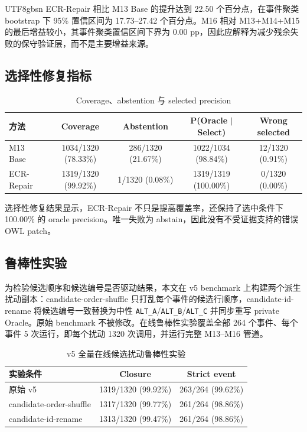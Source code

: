 \documentclass[11pt]{article}
\begin{document}
\begin{CJK*}{UTF8}{gbsn}
ECR-Repair 相比 M13 Base 的提升达到 22.50 个百分点，在事件聚类 bootstrap 下 95\% 置信区间为 17.73--27.42 个百分点。M16 相对 M13+M14+M15 的最后增益较小，其事件聚类置信区间下界为 0.00 pp，因此应解释为减少残余失败的保守验证层，而不是主要增益来源。

\subsection{选择性修复指标}

\begin{table}[t]
\centering
\caption{Coverage、abstention 与 selected precision}
\label{tab:selective}
\begin{tabular}{lcccc}
\toprule
方法 & Coverage & Abstention & P(Oracle $\mid$ Select) & Wrong selected \\
\midrule
M13 Base & 1034/1320 (78.33\%) & 286/1320 (21.67\%) & 1022/1034 (98.84\%) & 12/1320 (0.91\%) \\
ECR-Repair & 1319/1320 (99.92\%) & 1/1320 (0.08\%) & 1319/1319 (100.00\%) & 0/1320 (0.00\%) \\
\bottomrule
\end{tabular}
\end{table}

选择性修复结果显示，ECR-Repair 不只是提高覆盖率，还保持了选中条件下 100.00\% 的 oracle precision。唯一失败为 abstain，因此没有不受证据支持的错误 OWL patch。

\subsection{鲁棒性实验}

为检验候选顺序和候选编号是否驱动结果，本文在 v5 benchmark 上构建两个派生扰动副本：candidate-order-shuffle 只打乱每个事件的候选行顺序，candidate-id-rename 将候选编号一致替换为中性 \texttt{ALT\_A}/\texttt{ALT\_B}/\texttt{ALT\_C} 并同步重写 private Oracle。原始 benchmark 不被修改。在线鲁棒性实验覆盖全部 264 个事件、每个事件 5 次运行，即每个扰动 1320 次调用，并运行完整 M13--M16 管道。

\begin{table}[t]
\centering
\caption{v5 全量在线候选扰动鲁棒性实验}
\label{tab:online-robustness}
\begin{tabular}{lcc}
\toprule
实验条件 & Closure & Strict event \\
\midrule
原始 v5 & 1319/1320 (99.92\%) & 263/264 (99.62\%) \\
candidate-order-shuffle & 1317/1320 (99.77\%) & 261/264 (98.86\%) \\
candidate-id-rename & 1313/1320 (99.47\%) & 261/264 (98.86\%) \\
\bottomrule
\end{tabular}
\end{table}


\end{CJK*}
\end{document}
